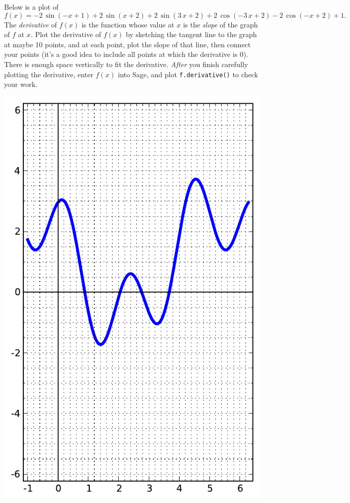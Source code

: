 Below is a plot of $$f(x)=-2 \, \sin\left(-x + 1\right) + 2 \, \sin\left(x + 2\right) + 2 \, \sin\left(3 \, x + 2\right) + 2 \, \cos\left(-3 \, x + 2\right) - 2 \, \cos\left(-x + 2\right) + 1.$$  The {\em \color{red}derivative} of $f(x)$ is the function whose value at $x$ is the {\em slope} of the graph of $f$ at $x$.  Plot the derivative of $f(x)$ by sketching the tangent line to the graph at maybe 10 points, and at each point, plot the slope of that line, then connect your points (it's a good idea to include all points at which the derivative is 0).  There is enough space vertically to fit the derivative.  {\em After} you finish carefully plotting the derivative, enter $f(x)$ into Sage, and plot {\color{blue}\verb|f.derivative()|} to check your work.
\begin{center}\includegraphics{functions/90.pdf}\end{center}\newpage

